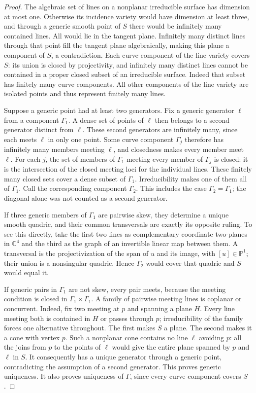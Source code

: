\begin{proof}
The algebraic set of lines on a nonplanar irreducible surface has
dimension at most one.  Otherwise its incidence variety would have
dimension at least three, and through a generic smooth point of
$S$ there would be infinitely many contained lines.  All would lie
in the tangent plane.  Infinitely many distinct lines through that
point fill the tangent plane algebraically, making this plane a
component of $S$, a contradiction.  Each curve component of the
line variety covers $S$: its union is closed by projectivity, and
infinitely many distinct lines cannot be contained in a proper
closed subset of an irreducible surface.  Indeed that subset has
finitely many curve components.  All other components of the line
variety are isolated points and thus represent finitely many lines.

Suppose a generic point had at least two generators. Fix a generic
generator $\ell$ from a component $\Gamma_1$. A dense set of points
of $\ell$ then belongs to a second generator distinct from $\ell$.
These second generators are infinitely many, since each meets
$\ell$ in only one point. Some curve component $\Gamma_j$ therefore
has infinitely many members meeting $\ell$, and closedness makes
every member meet $\ell$. For each $j$, the set of members of
$\Gamma_1$ meeting every member of $\Gamma_j$ is closed: it is the
intersection of the closed meeting loci for the individual lines.
These finitely many closed sets cover a dense subset of
$\Gamma_1$. Irreducibility makes one of them all of $\Gamma_1$.
Call the corresponding component $\Gamma_2$. This includes the
case $\Gamma_2=\Gamma_1$; the diagonal alone was not counted as a
second generator.

If three generic members of $\Gamma_1$ are pairwise skew, they
determine a unique smooth quadric, and their common transversals
are exactly its opposite ruling.  To see this directly, take the
first two lines as complementary coordinate two-planes in
$\mathbb C^4$ and the third as the graph of an invertible linear
map between them.  A transversal is the projectivization of the
span of $u$ and its image, with $[u]\in\mathbb P^1$; their union
is a nonsingular quadric.  Hence $\Gamma_2$ would cover that quadric
and $S$ would equal it.

If generic pairs in $\Gamma_1$ are not skew, every pair meets,
because the meeting condition is closed in
$\Gamma_1\times\Gamma_1$.  A family of pairwise meeting lines is
coplanar or concurrent.  Indeed, fix two meeting at $p$ and spanning
a plane $H$.  Every line meeting both is contained in $H$ or passes
through $p$; irreducibility of the family forces one alternative
throughout.  The first makes $S$ a plane.  The second makes it a
cone with vertex $p$.  Such a nonplanar cone contains no line
$\ell$ avoiding $p$: all the joins from $p$ to the points of
$\ell$ would give the entire plane spanned by $p$ and $\ell$ in
$S$.  It consequently has a unique generator through a generic
point, contradicting the assumption of a second generator.
This proves generic uniqueness.  It also proves uniqueness of
$\Gamma$, since every curve component covers $S$.


\end{proof}
